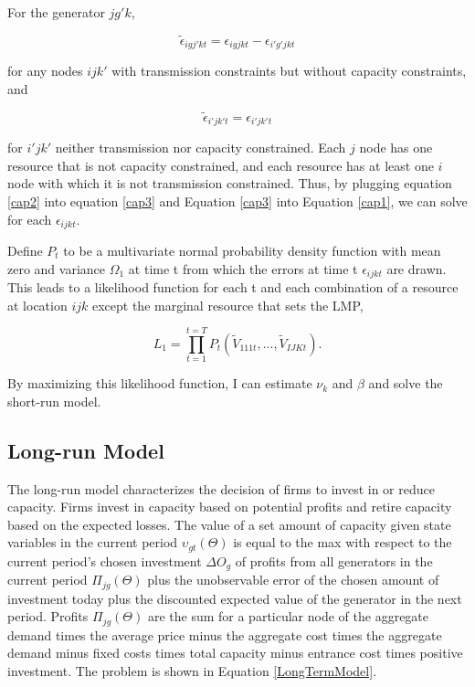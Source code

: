 \documentclass[12pt]{article}
\begin{document}
\noindent For the generator $jg'k$, 

\begin{equation}\label{cap3}
\tilde{\epsilon}_{igj'kt}=\epsilon_{igjkt}-\epsilon_{i'g'jkt}
\end{equation}

\noindent for any nodes $ijk'$ with transmission constraints but without capacity constraints, and 

\begin{equation}\label{cap2}
\tilde{\epsilon}_{i'jk't}=\epsilon_{i'jk't}
\end{equation}

\noindent for $i'jk'$ neither transmission nor capacity constrained. Each $j$ node has one resource that is not capacity constrained, and each resource has at least one $i$ node with which it is not transmission constrained. Thus, by plugging equation \ref{cap2} into equation \ref{cap3} and Equation \ref{cap3} into Equation \ref{cap1}, we can solve for each $\epsilon_{ijkt}.$

Define $P_t$ to be a multivariate normal probability density function with mean zero and variance $\Omega_1$ at time t from which the errors at time t $\epsilon_{ijkt}$ are drawn. This leads to a likelihood function for each t and each combination of a resource at location $ijk$ except the marginal resource that sets the LMP,

\begin{equation}\label{likelihoodFunction}
L_1= \prod_{t=1}^{t=T} P_t(\tilde{V}_{111t},...,\tilde{V}_{IJKt}).
\end{equation}

\noindent By maximizing this likelihood function, I can estimate $\nu_k$ and $\beta$ and solve the short-run model.

\subsection{Long-run Model}

The long-run model characterizes the decision of firms to invest in or reduce capacity. Firms invest in capacity based on potential profits and retire capacity based on the expected losses. The value of a set amount of capacity given state variables in the current period $\upsilon_{gt}(\Theta)$ is equal to the max with respect to the current period's chosen investment $\Delta O_{g}$ of profits from all generators in the current period $\Pi_{jg}(\Theta)$ plus the unobservable error of the chosen amount of investment today plus the discounted expected value of the generator in the next period. Profits $\Pi_{jg}(\Theta)$ are the sum for a particular node of the aggregate demand times the average price minus the aggregate cost times the aggregate demand minus fixed costs times total capacity minus entrance cost times positive investment. The problem is shown in Equation \ref{LongTermModel}.
\end{document}
